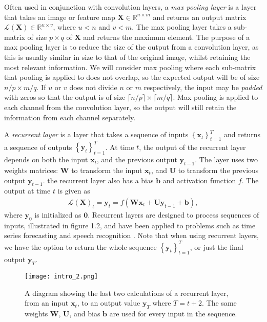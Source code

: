 \documentclass{somasmsc}
\begin{document}
Often used in conjunction with convolution layers, a \textit{max pooling layer} is a layer that takes an image or feature map $\mathbf{X} \in \mathbb{R}^{n \times m}$ and returns an output matrix $\mathcal{L}\left(\mathbf{X}\right) \in \mathbb{R}^{u \times v}$, where $u < n$ and $v < m$. The max pooling layer takes a sub-matrix of size $p \times q$ of $\mathbf{X}$ and returns the maximum element. The purpose of a max pooling layer is to reduce the size of the output from a convolution layer, as this is usually similar in size to that of the original image, whilst retaining the most relevant information. We will consider max pooling where each sub-matrix that pooling is applied to does not overlap, so the expected output will be of size $n/p \times m/q$. If $u$ or $v$ does not divide $n$ or $m$ respectively, the input may be \textit{padded} with zeros so that the output is of size $\lceil n/p \rceil \times \lceil m/q \rceil$. Max pooling is applied to each channel from the convolution layer, so the output will still retain the information from each channel separately.

A \textit{recurrent layer} is a layer that takes a sequence of inputs $\left\{\pmb{x}_t\right\}_{t=1}^T$ and returns a sequence of outputs $\left\{\pmb{y}_t\right\}_{t=1}^T$. At time $t$, the output of the recurrent layer depends on both the input $\pmb{x}_t$, and the previous output $\pmb{y}_{t-1}$. The layer uses two weights matrices: $\mathbf{W}$ to transform the input $\pmb{x}_t$, and $\mathbf{U}$ to transform the previous output $\pmb{y}_{t-1}$. the recurrent layer also has a bias $\pmb{b}$ and activation function $f$. The output at time $t$ is given as
\begin{align*}
\mathcal{L}\left(\mathbf{X}\right)_t = \pmb{y}_t = f(\mathbf{W}\pmb{x}_t + \mathbf{U}\pmb{y}_{t-1} + \pmb{b}),
\end{align*}
where $\pmb{y}_0$ is initialized as $\mathbf{0}$. Recurrent layers are designed to process sequences of inputs, illustrated in figure 1.2, and have been applied to problems such as time series forecasting and speech recognition \citep{graves2013speech}. Note that when using recurrent layers, we have the option to return the whole sequence $\left\{\pmb{y}_t\right\}_{t=1}^T$, or just the final output $\pmb{y}_T$.

\begin{figure}[H]
\begin{center}
\texttt{[image: intro\_2.png]}
\end{center}
\caption{A diagram showing the last two calculations of a recurrent layer, from an input $\pmb{x}_t$, to an output value $\pmb{y}_T$ where $T=t+2$. The same weights $\mathbf{W}$, $\mathbf{U}$, and bias $\pmb{b}$ are used for every input in the sequence.}
\end{figure}
\end{document}
